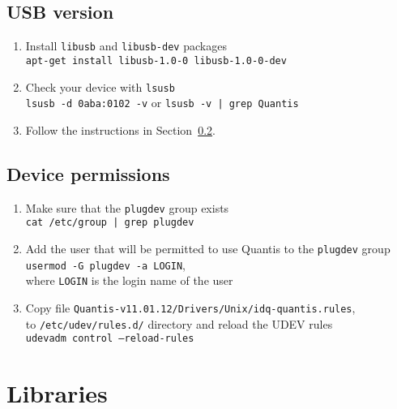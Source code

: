 \documentclass[a4paper,11pt]{article}
\begin{document}
\subsection{USB version}
\begin{enumerate}
    \item Install \texttt{libusb} and \texttt{libusb-dev} packages\\ 
    \texttt{apt-get install libusb-1.0-0 libusb-1.0-0-dev}
    \item Check your device with \texttt{lsusb}\\
    \texttt{lsusb -d 0aba:0102 -v} or \texttt{lsusb -v | grep Quantis}
    \item Follow the instructions in Section~\ref{sec:permissions}.
\end{enumerate}


\subsection{Device permissions}\label{sec:permissions}
\begin{enumerate}
    \item Make sure that the \texttt{plugdev} group exists\\
    \texttt{cat /etc/group | grep plugdev}
    \item Add the user that will be permitted to use Quantis to the \texttt{plugdev} group\\
    \texttt{usermod -G plugdev -a LOGIN},\\ where \texttt{LOGIN} is the login name of the user
    \item Copy file \texttt{Quantis-v11.01.12/Drivers/Unix/idq-quantis.rules},\\ to \texttt{/etc/udev/rules.d/} directory and reload the UDEV rules\\
    \texttt{udevadm control --reload-rules}
\end{enumerate}

\section{Libraries}
\end{document}
